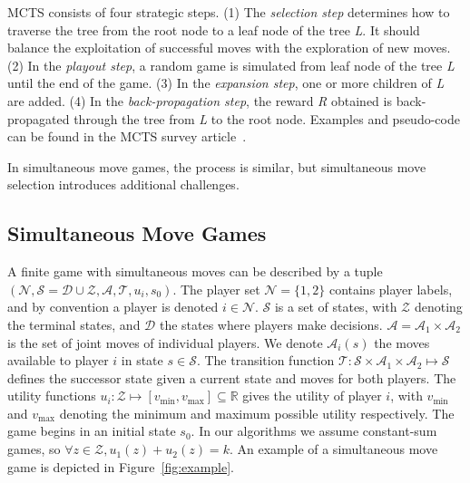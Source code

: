 \documentclass[conference]{IEEEtran}
\newcommand{\cA}{\mathcal{A}}
\newcommand{\cD}{\mathcal{D}}
\newcommand{\cN}{\mathcal{N}}
\newcommand{\cS}{\mathcal{S}}
\newcommand{\cT}{\mathcal{T}}
\newcommand{\cZ}{\mathcal{Z}}
\begin{document}
MCTS consists of four strategic steps. (1) The \textit{selection step} determines how to traverse the tree from the 
root node to a leaf node of the tree \textit{L}. It should balance the exploitation of successful moves with the 
exploration of new moves. (2) In the \textit{playout step}, a random game is simulated from leaf node of the tree 
\textit{L} until the end of the game.  (3) In the \textit{expansion step}, one or more children of \textit{L} are 
added. (4) In the \textit{back-propagation step}, the reward \textit{R} obtained is back-propagated through the tree 
from \textit{L} to the root node. Examples and pseudo-code can be found in the MCTS survey article~\cite{Browne12MCTSSurvey}.

In simultaneous move games, the process is similar, but simultaneous move selection introduces additional challenges.

\subsection{Simultaneous Move Games}

A finite game with simultaneous moves can be described by a tuple 
$(\cN, \cS = \cD \cup \cZ, \cA, \cT, u_i, s_0)$. The player set $\cN = \{ 1, 2 \}$ contains player 
labels, and by convention a player is denoted $i \in \cN$.
$\cS$ is a set of states, with $\cZ$ denoting the terminal states, and $\cD$ the states where players make decisions.
$\cA = \cA_1 \times \cA_2$ is the set of joint moves of individual players. We denote $\cA_i(s)$ the moves available 
to player $i$ in state $s \in \cS$. The 
transition function $\cT : \cS \times \cA_1 \times \cA_2 \mapsto \cS$ defines the successor state given a current 
state and moves for both players. The utility functions 
$u_i : \cZ \mapsto [v_{\min}, v_{\max}] \subseteq \mathbb{R}$ gives the utility of player $i$, with 
$v_{\min}$ and $v_{\max}$ denoting the minimum and maximum possible utility respectively. 
The game begins in an initial state $s_0$. In our algorithms we assume constant-sum games, so
$\forall z \in \cZ, u_1(z) + u_2(z) = k$. 
An example of a simultaneous move game is depicted in Figure~\ref{fig:example}. 
\end{document}
